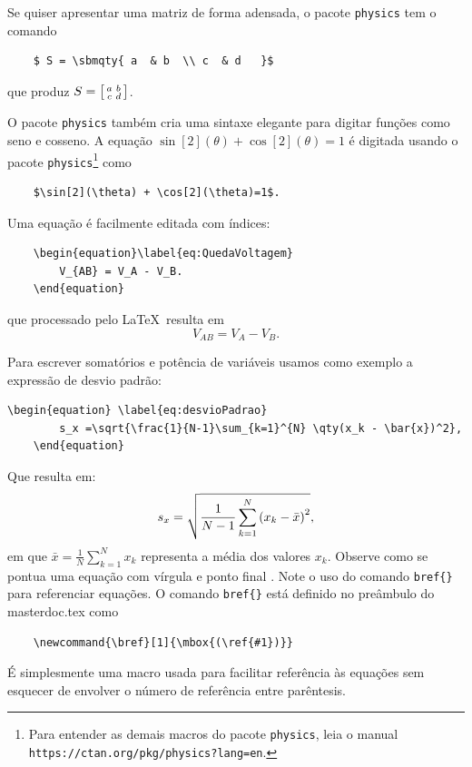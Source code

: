 Se quiser apresentar uma matriz de forma adensada, o pacote \texttt{physics} tem o comando 
\begin{verbatim}
	$ S = \sbmqty{ a  & b  \\ c  & d   }$
\end{verbatim}
que produz $ S = \sbmqty{ a  & b  \\ c  & d   }$.

O pacote \texttt{physics} também cria uma sintaxe elegante para digitar funções como seno e cosseno.
A equação $\sin[2](\theta) + \cos[2](\theta)=1$ é digitada usando o pacote \texttt{physics}\footnote{
	Para entender as demais macros do pacote \texttt{physics}, leia o manual  \texttt{https://ctan.org/pkg/physics?lang=en}.} como
\begin{verbatim}
	$\sin[2](\theta) + \cos[2](\theta)=1$.
\end{verbatim}

Uma equação é facilmente editada com índices:
\begin{verbatim}
	\begin{equation}\label{eq:QuedaVoltagem}
		V_{AB} = V_A - V_B. 
	\end{equation}
\end{verbatim}

que processado pelo \LaTeX\ resulta em
\begin{equation}\label{eq:QuedaVoltagem}
	V_{AB} = V_A - V_B. 
\end{equation}

Para escrever  somatórios e potência de variáveis usamos como exemplo a expressão de desvio padrão: 
\begin{lstlisting}[language={[Latex]Tex},frame=single]
	\begin{equation} \label{eq:desvioPadrao}
		s_x =\sqrt{\frac{1}{N-1}\sum_{k=1}^{N} \qty(x_k - \bar{x})^2},
	\end{equation}
\end{lstlisting}

Que resulta em:
\begin{equation}\label{eq:desvioPadrao}
	s_x =\sqrt{\frac{1}{N-1}\sum_{k=1}^{N} \qty(x_k - \bar{x})^2},
\end{equation}
em que $\bar{x}=\frac{1}{N}\sum_{k=1}^{N}x_k$ representa a média dos valores $x_k$. Observe como se pontua uma equação com vírgula  e ponto final . Note o uso do comando \texttt{bref\{\}} para referenciar equações. O comando \texttt{bref\{\}}  está definido no preâmbulo do masterdoc.tex como
\begin{verbatim}
	\newcommand{\bref}[1]{\mbox{(\ref{#1})}}
\end{verbatim}
É simplesmente  uma macro usada para facilitar referência às equações sem esquecer de envolver o número de referência entre parêntesis. 

